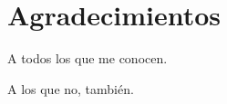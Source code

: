 \chapter*{Agradecimientos}

\noindent A todos los que me conocen.

\vspace{0.5cm}

\noindent A los que no, también.
